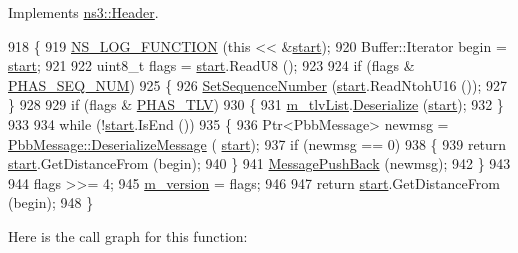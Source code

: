 Implements \hyperlink{classns3_1_1Header_a78be9400bb66b2a8543606f395ef5396}{ns3\+::\+Header}.


\begin{DoxyCode}
918 \{
919   \hyperlink{log-macros-disabled_8h_a90b90d5bad1f39cb1b64923ea94c0761}{NS\_LOG\_FUNCTION} (\textcolor{keyword}{this} << &\hyperlink{namespacevisualizer_1_1core_a2a35e5d8a34af358b508dac8635754e0}{start});
920   Buffer::Iterator begin = \hyperlink{namespacevisualizer_1_1core_a2a35e5d8a34af358b508dac8635754e0}{start};
921 
922   uint8\_t flags = \hyperlink{namespacevisualizer_1_1core_a2a35e5d8a34af358b508dac8635754e0}{start}.ReadU8 ();
923 
924   \textcolor{keywordflow}{if} (flags & \hyperlink{packetbb_8cc_a5308ec13dafe8b9ad8aba2824f3a829b}{PHAS\_SEQ\_NUM})
925     \{
926       \hyperlink{classns3_1_1PbbPacket_a7d6a1602be86109760d0f26ff9bbbb8e}{SetSequenceNumber} (\hyperlink{namespacevisualizer_1_1core_a2a35e5d8a34af358b508dac8635754e0}{start}.ReadNtohU16 ());
927     \}
928 
929   \textcolor{keywordflow}{if} (flags & \hyperlink{packetbb_8cc_ab5df0d54fe036af57bbdb86cbb668ca2}{PHAS\_TLV})
930     \{
931       \hyperlink{classns3_1_1PbbPacket_af24e9b73e6b1d8c113b52041860e9a35}{m\_tlvList}.\hyperlink{classns3_1_1PbbTlvBlock_acbc87f2a174253635e76f28bed9e1070}{Deserialize} (\hyperlink{namespacevisualizer_1_1core_a2a35e5d8a34af358b508dac8635754e0}{start});
932     \}
933 
934   \textcolor{keywordflow}{while} (!\hyperlink{namespacevisualizer_1_1core_a2a35e5d8a34af358b508dac8635754e0}{start}.IsEnd ())
935     \{
936       Ptr<PbbMessage> newmsg = \hyperlink{classns3_1_1PbbMessage_a58a4ce8ce3f757d5e5d9b7d89d632bc2}{PbbMessage::DeserializeMessage} (
      \hyperlink{namespacevisualizer_1_1core_a2a35e5d8a34af358b508dac8635754e0}{start});
937       \textcolor{keywordflow}{if} (newmsg == 0)
938         \{
939           \textcolor{keywordflow}{return} \hyperlink{namespacevisualizer_1_1core_a2a35e5d8a34af358b508dac8635754e0}{start}.GetDistanceFrom (begin);
940         \}
941       \hyperlink{classns3_1_1PbbPacket_a4a3170001ef758d9c9c4375b8f089826}{MessagePushBack} (newmsg);
942     \}
943 
944   flags >>= 4;
945   \hyperlink{classns3_1_1PbbPacket_a087fc7baaed63b3bf0e8e0ec5f555642}{m\_version} = flags;
946 
947   \textcolor{keywordflow}{return} \hyperlink{namespacevisualizer_1_1core_a2a35e5d8a34af358b508dac8635754e0}{start}.GetDistanceFrom (begin);
948 \}
\end{DoxyCode}


Here is the call graph for this function\+:




